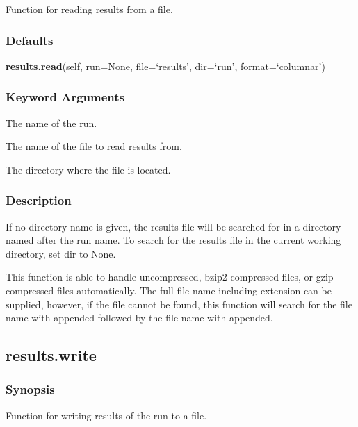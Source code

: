 Function for reading results from a file.



\subsubsection{Defaults}

\textsf{\textbf{results.read}(self, run=None, file=`results', dir=`run', format=`columnar')}


\subsubsection{Keyword Arguments}

  The name of the run. 

  The name of the file to read results from. 

  The directory where the file is located. 




\subsubsection{Description}

If no directory name is given, the results file will be searched for in a directory named after the run name.  To search for the results file in the current working directory, set dir to None.


This function is able to handle uncompressed, bzip2 compressed files, or gzip compressed files automatically.  The full file name including extension can be supplied, however, if the file cannot be found, this function will search for the file name with  appended followed by the file name with  appended.




\newpage

\subsection{results.write}


\subsubsection{Synopsis}

Function for writing results of the run to a file.



